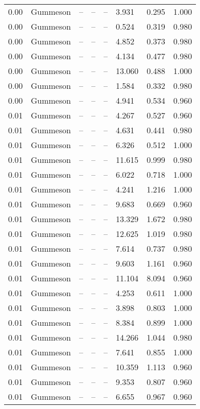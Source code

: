 \begin{table}[H]
\begin{tabular}{l c l l l}
0.00 & Gummeson & -- & -- & -- & 3.931 & 0.295 & 1.000 \\
0.00 & Gummeson & -- & -- & -- & 0.524 & 0.319 & 0.980 \\
0.00 & Gummeson & -- & -- & -- & 4.852 & 0.373 & 0.980 \\
0.00 & Gummeson & -- & -- & -- & 4.134 & 0.477 & 0.980 \\
0.00 & Gummeson & -- & -- & -- & 13.060 & 0.488 & 1.000 \\
0.00 & Gummeson & -- & -- & -- & 1.584 & 0.332 & 0.980 \\
0.00 & Gummeson & -- & -- & -- & 4.941 & 0.534 & 0.960 \\
0.01 & Gummeson & -- & -- & -- & 4.267 & 0.527 & 0.960 \\
0.01 & Gummeson & -- & -- & -- & 4.631 & 0.441 & 0.980 \\
0.01 & Gummeson & -- & -- & -- & 6.326 & 0.512 & 1.000 \\
0.01 & Gummeson & -- & -- & -- & 11.615 & 0.999 & 0.980 \\
0.01 & Gummeson & -- & -- & -- & 6.022 & 0.718 & 1.000 \\
0.01 & Gummeson & -- & -- & -- & 4.241 & 1.216 & 1.000 \\
0.01 & Gummeson & -- & -- & -- & 9.683 & 0.669 & 0.960 \\
0.01 & Gummeson & -- & -- & -- & 13.329 & 1.672 & 0.980 \\
0.01 & Gummeson & -- & -- & -- & 12.625 & 1.019 & 0.980 \\
0.01 & Gummeson & -- & -- & -- & 7.614 & 0.737 & 0.980 \\
0.01 & Gummeson & -- & -- & -- & 9.603 & 1.161 & 0.960 \\
0.01 & Gummeson & -- & -- & -- & 11.104 & 8.094 & 0.960 \\
0.01 & Gummeson & -- & -- & -- & 4.253 & 0.611 & 1.000 \\
0.01 & Gummeson & -- & -- & -- & 3.898 & 0.803 & 1.000 \\
0.01 & Gummeson & -- & -- & -- & 8.384 & 0.899 & 1.000 \\
0.01 & Gummeson & -- & -- & -- & 14.266 & 1.044 & 0.980 \\
0.01 & Gummeson & -- & -- & -- & 7.641 & 0.855 & 1.000 \\
0.01 & Gummeson & -- & -- & -- & 10.359 & 1.113 & 0.960 \\
0.01 & Gummeson & -- & -- & -- & 9.353 & 0.807 & 0.960 \\
0.01 & Gummeson & -- & -- & -- & 6.655 & 0.967 & 0.960 \\

\end{tabular}
\end{table}
